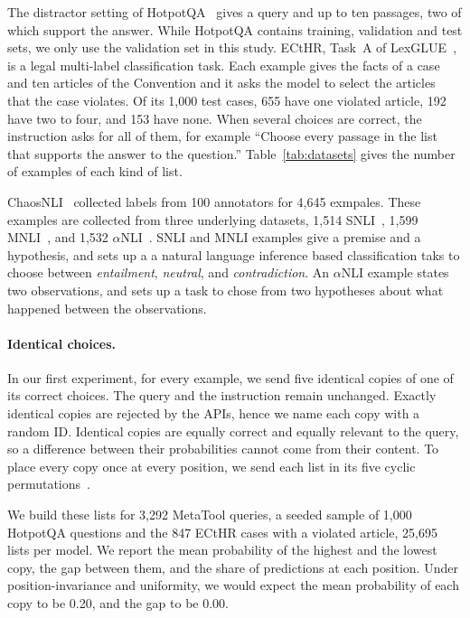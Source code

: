 The distractor setting of HotpotQA~\citep{yang2018hotpotqa} gives a query and up to ten passages, two of which support the answer. While HotpotQA contains training, validation and test sets, we only use the validation set in this study.
 ECtHR, Task~A of LexGLUE~\citep{chalkidis2022lexglue}, is a legal multi-label classification task. Each example
 gives the facts of a case and ten articles of the Convention and it asks the model to select the articles that the case violates. Of its 1,000 test cases, 655 have one violated article, 192 have two to four, and 153 have none. When several choices are correct, the instruction asks for all of them, for example ``Choose every passage in the list that supports the answer to the question.'' Table~\ref{tab:datasets} gives the number of examples of each kind of list.

ChaosNLI~\citep{nie2020chaosnli} collected labels from 100 annotators for 4,645 exmpales. These examples are collected from three underlying datasets, 1,514 SNLI~\citep{bowman2015large}, 1,599 MNLI~\citep{williams2018broad}, and 1,532 $\alpha$NLI~\citep{bhagavatula2020abductive}. SNLI and MNLI examples give a premise and a hypothesis, and sets up a a natural language inference based classification taks to choose between  \textit{entailment}, \textit{neutral}, and \textit{contradiction}. An $\alpha$NLI example states two observations, and sets up a task to chose from two hypotheses about what happened between the observations.


\paragraph{Identical choices.}
In our first experiment, for every example, we send five identical copies of one of its correct choices. The query and the instruction remain unchanged. Exactly identical copies are rejected by the APIs, hence we name each copy with a random ID. Identical copies are equally correct and equally relevant to the query, so a difference between their probabilities cannot come from their content. To place every copy once at every position, we send each list in its five cyclic permutations~\citep{zheng2024large,pezeshkpour2024large}.

We build these lists for 3,292 MetaTool queries, a seeded sample of 1,000 HotpotQA questions and the 847 ECtHR cases with a violated article, 25,695 lists per model. We report the mean probability of the highest and the lowest copy, the gap between them, and the share of predictions at each position. Under position-invariance and uniformity, we would expect the mean probability of each copy to be 0.20, and the gap to be 0.00.

